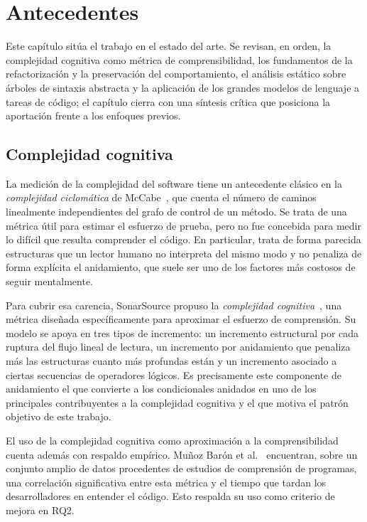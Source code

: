 
\chapter{Antecedentes}
\label{cap:antecedentes}

Este capítulo sitúa el trabajo en el estado del arte. Se revisan, en orden, la
complejidad cognitiva como métrica de comprensibilidad, los fundamentos de la
refactorización y la preservación del comportamiento, el análisis estático
sobre árboles de sintaxis abstracta y la aplicación de los grandes modelos de
lenguaje a tareas de código; el capítulo cierra con una síntesis crítica que
posiciona la aportación frente a los enfoques previos.

\section{Complejidad cognitiva}
\label{sec:cc-antecedentes}

La medición de la complejidad del software tiene un antecedente clásico en la
\emph{complejidad ciclomática} de McCabe~\cite{10.1109/TSE.1976.233837}, que
cuenta el número de caminos linealmente independientes del grafo de control de
un método. Se trata de una métrica útil para estimar el esfuerzo de prueba, pero
no fue concebida para medir lo difícil que resulta comprender el código. En particular, trata de forma parecida estructuras que un lector humano no interpreta del mismo modo
y no penaliza de forma explícita el anidamiento, que suele
ser uno de los factores más costosos de seguir mentalmente.

Para cubrir esa carencia, SonarSource propuso la \emph{complejidad
cognitiva}~\cite{10.1145/3194164.3194186}, una métrica diseñada
específicamente para aproximar el esfuerzo de comprensión. Su modelo se apoya
en tres tipos de incremento: un incremento estructural por cada ruptura del flujo
lineal de lectura, un incremento por anidamiento que penaliza más las
estructuras cuanto más profundas están y un incremento asociado a ciertas
secuencias de operadores lógicos. Es precisamente este componente de
anidamiento el que convierte a los condicionales anidados en uno de los
principales contribuyentes a la complejidad cognitiva y el que motiva el patrón
objetivo de este trabajo.

El uso de la complejidad cognitiva como aproximación a la comprensibilidad
cuenta además con respaldo empírico. Muñoz Barón et
al.~\cite{10.1145/3382494.3410636} encuentran, sobre un conjunto amplio de
datos procedentes de estudios de comprensión de programas, una correlación
significativa entre esta métrica y el
tiempo que tardan los desarrolladores en entender el código. Esto respalda su
uso como criterio de mejora en RQ2.

